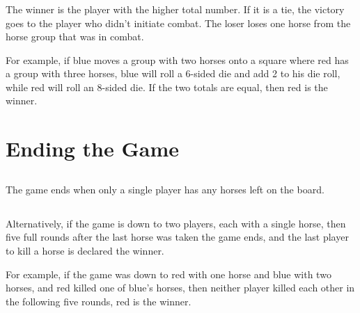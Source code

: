 \documentclass[12pt]{article} %
\begin{document}
\subsubsection{}
The winner is the player with the higher total number.  If it is a tie, the victory goes to the player who didn't initiate combat.  The loser loses one horse from the horse group that was in combat.\newline

 For example, if blue moves a group with two horses onto a square where red has a group with three horses, blue will roll a 6-sided die and add 2 to his die roll, while red will roll an 8-sided die.  If the two totals are equal, then red is the winner.

\section{Ending the Game}

\subsection{}
The game ends when only a single player has any horses left on the board.

\subsection{}
Alternatively, if the game is down to two players, each with a single horse, then five full rounds after the last horse was taken the game ends, and the last player to kill a horse is declared the winner.  \newline

For example, if the game was down to red with one horse and blue with two horses, and red killed one of blue's horses, then neither player killed each other in the following five rounds, red is the winner.
\end{document}

